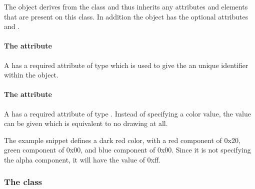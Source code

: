 The \ColorDefinition object derives from the \SBase class and thus
inherits any attributes and elements that are present on this class.
In addition the \ColorDefinition object has the optional attributes  and .

\paragraph{The \fixttspace{} attribute}

A \ColorDefinition has a required attribute  of type
 which is used to give the \ColorDefinition an unique identifier within the \RenderInformation object.

\paragraph{The \fixttspace{} attribute}

A \ColorDefinition has a required attribute  of type
. Instead of 
specifying a color value, the value  can be given which is equivalent to 
no drawing at all.

The example snippet defines a dark red color, with a red component of 0x20, green 
component of 0x00, and blue component of 0x00. Since it is not specifying the alpha 
component, it will have the value of 0xff. 

{\footnotesize
{}
}


\subsubsection{The  class}
\label{gradientbase-class}


